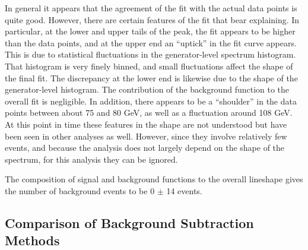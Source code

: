 
In general it appears that the agreement of the fit 
with the actual data points is quite good.  
However, there are certain features of the fit 
that bear explaining.  
In particular, 
at the lower and upper tails of the peak, 
the fit appears to be higher than the data points, 
and at the upper end an ``uptick'' in the fit 
curve appears.  
This is due to statistical fluctuations in 
the generator-level \Zee spectrum histogram.  
That histogram is very finely binned, 
and small fluctuations affect the shape of the final fit.  
The discrepancy at the lower end is likewise 
due to the shape of the generator-level histogram.  
The contribution of the background function to the 
overall fit is negligible.  
In addition, there appears to be a ``shoulder'' 
in the data points between about 75 and 80 GeV, 
as well as a fluctuation around 108 GeV.  
At this point in time these features in the shape 
are not understood but have been seen in 
other analyses as well.  %
However, since they involve relatively few events, 
and because the analysis does not largely 
depend on the shape of the spectrum, 
for this analysis they can be ignored.  

The composition of signal and background 
functions to the overall lineshape 
gives the number of background events 
to be 0 $\pm$ 14 events.  


\subsection{Comparison of Background Subtraction Methods}
\label{anMeth:BGSubComp}


